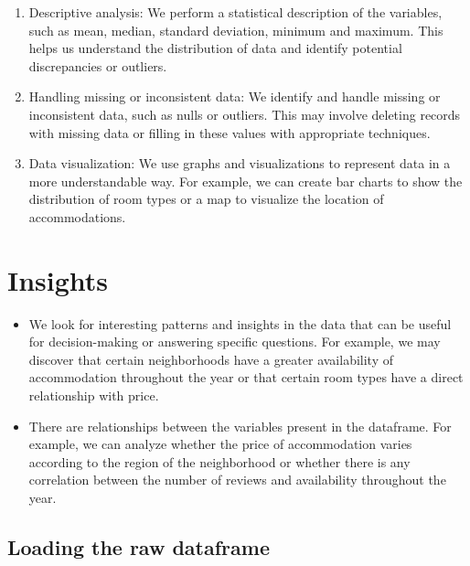 \documentclass[
]{article}
\begin{document}
\begin{enumerate}
\def\labelenumi{\arabic{enumi}.}
\item
  Descriptive analysis: We perform a statistical description of the
  variables, such as mean, median, standard deviation, minimum and
  maximum. This helps us understand the distribution of data and
  identify potential discrepancies or outliers.
\item
  Handling missing or inconsistent data: We identify and handle missing
  or inconsistent data, such as nulls or outliers. This may involve
  deleting records with missing data or filling in these values with
  appropriate techniques.
\item
  Data visualization: We use graphs and visualizations to represent data
  in a more understandable way. For example, we can create bar charts to
  show the distribution of room types or a map to visualize the location
  of accommodations.
\end{enumerate}

\hypertarget{insights}{%
\section{Insights}\label{insights}}

\begin{itemize}
\item
  We look for interesting patterns and insights in the data that can be
  useful for decision-making or answering specific questions. For
  example, we may discover that certain neighborhoods have a greater
  availability of accommodation throughout the year or that certain room
  types have a direct relationship with price.
\item
  There are relationships between the variables present in the
  dataframe. For example, we can analyze whether the price of
  accommodation varies according to the region of the neighborhood or
  whether there is any correlation between the number of reviews and
  availability throughout the year.
\end{itemize}

\hypertarget{loading-the-raw-dataframe}{%
\subsection{Loading the raw dataframe}\label{loading-the-raw-dataframe}}
\end{document}
